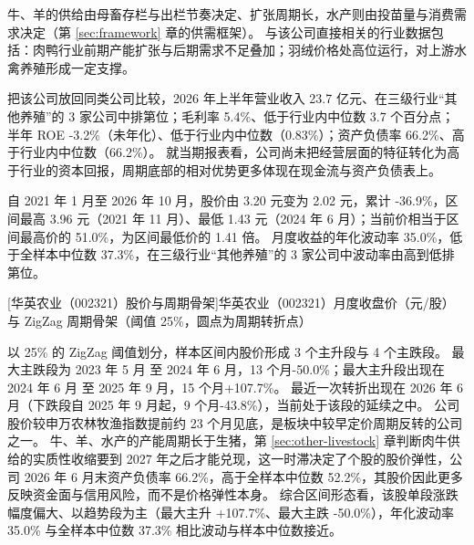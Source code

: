  牛、羊的供给由母畜存栏与出栏节奏决定、扩张周期长，水产则由投苗量与消费需求决定（第 \ref{sec:framework} 章的供需框架）。 与该公司直接相关的行业数据包括：肉鸭行业前期产能扩张与后期需求不足叠加；羽绒价格处高位运行，对上游水禽养殖形成一定支撑。

 把该公司放回同类公司比较，2026 年上半年营业收入 23.7 亿元、在三级行业“其他养殖”的 3 家公司中排第位；毛利率 5.4\%、低于行业内中位数 3.7 个百分点；半年 ROE -3.2\%（未年化）、低于行业内中位数（0.83\%）；资产负债率 66.2\%、高于行业内中位数（66.2\%）。 就当期报表看，公司尚未把经营层面的特征转化为高于行业的资本回报，周期底部的相对优势更多体现在现金流与资产负债表上。

 自 2021 年 1 月至 2026 年 10 月，股价由 3.20 元变为 2.02 元，累计 -36.9\%，区间最高 3.96 元（2021 年 11 月）、最低 1.43 元（2024 年 6 月）；当前价相当于区间最高价的 51.0\%，为区间最低价的 1.41 倍。 月度收益的年化波动率 35.0\%，低于全样本中位数 37.3\%，在三级行业“其他养殖”的 3 家公司中波动率由高到低排第位。

\begin{center}
\begin{minipage}{\textwidth}\centering
{}

[华英农业（002321）股价与周期骨架]{华英农业（002321）月度收盘价（元/股）与 ZigZag 周期骨架（阈值 25\%，圆点为周期转折点）}
\end{minipage}
\end{center}

 以 25\% 的 ZigZag 阈值划分，样本区间内股价形成 3 个主升段与 4 个主跌段。 最大主跌段为 2023 年 5 月 至 2024 年 6 月，13 个月-50.0\%；最大主升段出现在 2024 年 6 月 至 2025 年 9 月，15 个月+107.7\%。 最近一次转折出现在 2026 年 6 月（下跌段自 2025 年 9 月起，9 个月-43.8\%），当前处于该段的延续之中。 公司股价较申万农林牧渔指数提前约 23 个月见底，是板块中较早定价周期反转的公司之一。 牛、羊、水产的产能周期长于生猪，第 \ref{sec:other-livestock} 章判断肉牛供给的实质性收缩要到 2027 年之后才能兑现，这一时滞决定了个股的股价弹性，公司 2026 年 6 月末资产负债率 66.2\%，高于全样本中位数 52.2\%，其股价因此更多反映资金面与信用风险，而不是价格弹性本身。 综合区间形态看，该股单段涨跌幅度偏大、以趋势段为主（最大主升 +107.7\%、最大主跌 -50.0\%），年化波动率 35.0\% 与全样本中位数 37.3\% 相比波动与样本中位数接近。

